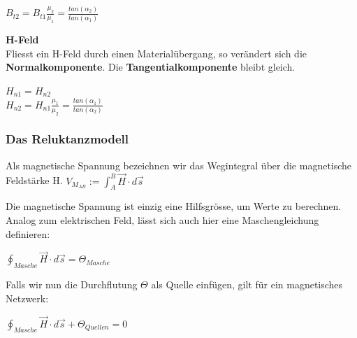  $\displaystyle B_{t2} = B_{t1} \frac{\mu_2}{\mu_1}  = \frac{tan(\alpha_2)}{tan(\alpha_1)}$
\formulaEnd

\textbf{H-Feld} \\
Fliesst ein H-Feld durch einen Materialübergang, so verändert sich die \textbf{Normalkomponente}. Die \textbf{Tangentialkomponente} bleibt gleich.

\begin{center}
\end{center}

\formulaBegin
$ \displaystyle H_{n1} = H_{n2}$
\\ \fspace
$\displaystyle H_{n2} = H_{n1} \frac{\mu_1}{\mu_2} = \frac{tan(\alpha_1)}{tan(\alpha_2)} $
\formulaEnd




\subsubsection{Das Reluktanzmodell}

	\beginip
	Als magnetische Spannung bezeichnen wir das Wegintegral über die magnetische Feldstärke H.
	\formulaBegin
	$\displaystyle V_{M_{AB}} := \int_A^B \vec{H} \cdot d\vec{s}$
	\formulaEnd

	Die magnetische Spannung ist einzig eine Hilfsgrösse, um Werte zu berechnen. \\
	Analog zum elektrischen Feld, lässt sich auch hier eine Maschengleichung definieren: \\
	\begin{center}
		$\displaystyle \oint_{Masche} \vec{H} \cdot d\vec{s} = \Theta_{Masche}$
	\end{center}
		Falls wir nun die Durchflutung $\Theta$ als Quelle einfügen, gilt für ein magnetisches Netzwerk:
		\begin{center}
			$\displaystyle \oint_{Masche} \vec{H} \cdot d\vec{s} + \Theta_{Quellen} = 0$
		\end{center}
	\iend

